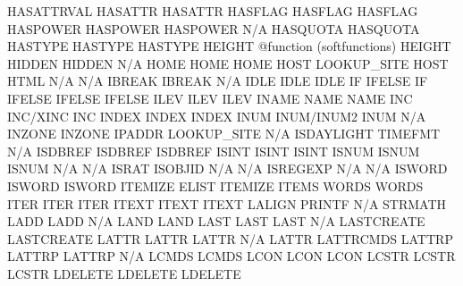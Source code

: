 \documentclass[letterpaper,10pt,english]{sphinxmanual}
\begin{document}
\begin{description}
HASATTRVAL              HASATTR                      HASATTR
HASFLAG                 HASFLAG                      HASFLAG
HASPOWER                HASPOWER                     HASPOWER
N/A                     HASQUOTA                     HASQUOTA
HASTYPE                 HASTYPE                      HASTYPE
HEIGHT                  @function (softfunctions)    HEIGHT
HIDDEN                  HIDDEN                       N/A
HOME                    HOME                         HOME
HOST                    LOOKUP\_SITE                  HOST
HTML                    N/A                          N/A
IBREAK                  IBREAK                       N/A
IDLE                    IDLE                         IDLE
IF                      IFELSE                       IF
IFELSE                  IFELSE                       IFELSE
ILEV                    ILEV                         ILEV
INAME                   NAME                         NAME
INC                     INC/XINC                     INC
INDEX                   INDEX                        INDEX
INUM                    INUM/INUM2                   INUM
N/A                     INZONE                       INZONE
IPADDR                  LOOKUP\_SITE                  N/A
ISDAYLIGHT              TIMEFMT                      N/A
ISDBREF                 ISDBREF                      ISDBREF
ISINT                   ISINT                        ISINT
ISNUM                   ISNUM                        ISNUM
N/A                     N/A                          ISRAT
ISOBJID                 N/A                          N/A
ISREGEXP                N/A                          N/A
ISWORD                  ISWORD                       ISWORD
ITEMIZE                 ELIST                        ITEMIZE
ITEMS                   WORDS                        WORDS
ITER                    ITER                         ITER
ITEXT                   ITEXT                        ITEXT
LALIGN                  PRINTF                       N/A
STRMATH                 LADD                         LADD
N/A                     LAND                         LAND
LAST                    LAST                         LAST
N/A                     LASTCREATE                   LASTCREATE
LATTR                   LATTR                        LATTR
N/A                     LATTR                        LATTRCMDS
LATTRP                  LATTRP                       LATTRP
N/A                     LCMDS                        LCMDS
LCON                    LCON                         LCON
LCSTR                   LCSTR                        LCSTR
LDELETE                 LDELETE                      LDELETE

\end{description}
\end{document}
